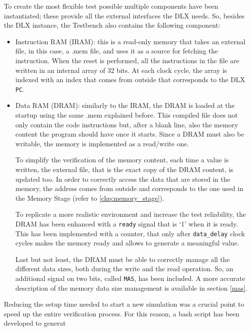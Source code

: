 To create the most flexible test possible multiple components have been instantiated; these provide all the external interfaces the DLX needs. So, besides the DLX instance, the Testbench also contains the following component:
\begin{itemize} 
    \item Instruction RAM (IRAM): this is a read-only memory that takes an external file, in this case, a .mem file, and uses it as a source for fetching the instruction. When the reset is performed, all the instructions in the file are written in an internal array of 32 bits. At each clock cycle, the array is indexed with an index that comes from outside that corresponds to the DLX \texttt{PC}.
    \item Data RAM (DRAM): similarly to the IRAM, the DRAM is loaded at the startup using the same .mem explained before. This compiled file does not only contain the code instructions but, after a blank line, also the memory content the program should have once it starts. Since a DRAM must also be writable, the memory is implemented as a read/write one. 
    
    To simplify the verification of the memory content, each time a value is written, the external file, that is the exact copy of the DRAM content, is updated too.
    In order to correctly access the data that are stored in the memory, the address comes from outside and corresponds to the one used in the Memory Stage (refer to \ref{chp:memory_stage}).
    
    To replicate a more realistic environment and increase the test reliability, the DRAM has been enhanced with a \texttt{ready} signal that is `1' when it is ready. This has been implemented with a counter, that only after \texttt{data\_delay} clock cycles makes the memory ready and allows to generate a meaningful value.
    
    Last but not least, the DRAM must be able to correctly manage all the different data sizes, both during the write and the read operation. So, an additional signal on two bits, called \texttt{MAS}, has been included. A more accurate description of the memory data size management is available in section \ref{mas}.
\end{itemize}

Reducing the setup time needed to start a new simulation was a crucial point to speed up the entire verification process. For this reason, a bash script has been developed to generat




